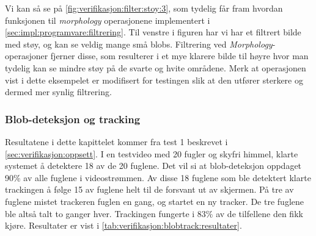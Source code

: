 
Vi kan så se på \autoref{fig:verifikasjon:filter:stoy:3}, som tydelig får fram hvordan funksjonen til \textit{morphology} operasjonene implementert i \autoref{sec:impl:programvare:filtrering}.
Til venstre i figuren har vi har et filtrert bilde med støy, og kan se veldig mange små blobs.
Filtrering ved \textit{Morphology}-operasjoner fjerner disse, som resulterer i et mye klarere bilde til høyre hvor man tydelig kan se mindre støy på de svarte og hvite områdene.
Merk at operasjonen vist i dette eksempelet er modifisert for testingen slik at den utfører sterkere og dermed mer synlig filtrering.


\subsubsection{Blob-deteksjon og tracking}\label{sec:verifikasjon:programvare:blob-detection_og_tracking}


Resultatene i dette kapittelet kommer fra test 1 beskrevet i \autoref{sec:verifikasjon:oppsett}.
I en testvideo med 20 fugler og skyfri himmel, klarte systemet å detektere 18 av de 20 fuglene. 
Det vil si at blob-deteksjon oppdaget 90\% av alle fuglene i videostrømmen.
Av disse 18 fuglene som ble detektert klarte trackingen å følge 15 av fuglene helt til de forsvant ut av skjermen. 
På tre av fuglene mistet trackeren fuglen en gang, og startet en ny tracker. 
De tre fuglene ble altså talt to ganger hver. 
Trackingen fungerte i $83\%$ av de tilfellene den fikk kjøre.
Resultater er vist i \autoref{tab:verifikasjon:blobtrack:resultater}.

